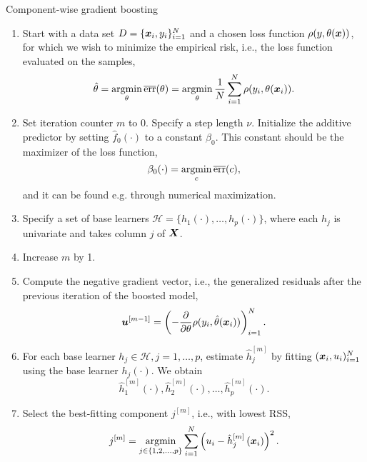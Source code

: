\begin{algorithm}
\caption{Component-wise gradient boosting}\label{algo:component-wise}
\begin{enumerate}
    \item
        Start with a data set $D=\{\bm{x}_i, y_i\}_{i=1}^N$ and a chosen loss function $\rho(y,\theta(\bm{x}))$, for which we wish to
        minimize the empirical risk, i.e., the loss function evaluated on the samples,
        \begin{equation*}
            \hat{\theta}=\operatorname*{argmin}_{\theta}\overline{\text{err}}(\theta)=\operatorname*{argmin}_{\theta}\frac{1}{N}\sum_{i=1}^N\rho(y_i,\theta(\bm{x}_i)).
        \end{equation*}
    \item
        Set iteration counter $m$ to 0.
        Specify a step length $\nu$.
        Initialize the additive predictor by setting $\hat{f}_0(\cdot)$ to a constant $\beta_0$.
        This constant should be the maximizer of the loss function,
        \begin{equation*}
            \beta_0(\cdot)=\operatorname*{argmin}_c \overline{\text{err}}(c),
        \end{equation*}
        and it can be found e.g. through numerical maximization.
    \item
        Specify a set of base learners $\mathcal{H}=\{h_1(\cdot),\dotsc,h_p(\cdot)\}$, where each $h_j$ is univariate and takes column $j$ of $\bm{X}$.
    \item
        \label{first-step}
        Increase $m$ by 1.
    \item
        Compute the negative gradient vector, i.e., the generalized residuals after the previous iteration of the boosted model,
        \begin{equation*}
            \bm{u}^{[m-1]}=\left(-\frac{\partial}{\partial \theta}\rho(y_i, \hat{\theta}(\bm{x}_i))\right)_{i=1}^N.
        \end{equation*}
    \item
        For each base learner $h_j\in\mathcal{H},j=1,\ldots,p$, estimate $\hat{h}_{j}^{[m]}$ by fitting $(\bm{x}_i,u_i)_{i=1}^N$ using the base learner $h_j(\cdot)$.
        We obtain
        \begin{equation*}
            \hat{h}_1^{[m]}(\cdot),\hat{h}_2^{[m]}(\cdot),\ldots,\hat{h}_p^{[m]}(\cdot).
        \end{equation*}
    \item
        Select the best-fitting component $j^{[m]}$, i.e., with lowest RSS,
        \begin{equation*}
            j^{[m]}=\argmin_{j\in\{1,2,\ldots,p\}}\sum_{i=1}^N \left(u_i-\hat{h}_j^{[m]}\left(\x_{i}\right)\right)^2.

\end{equation*}
\end{enumerate}
\end{algorithm}

